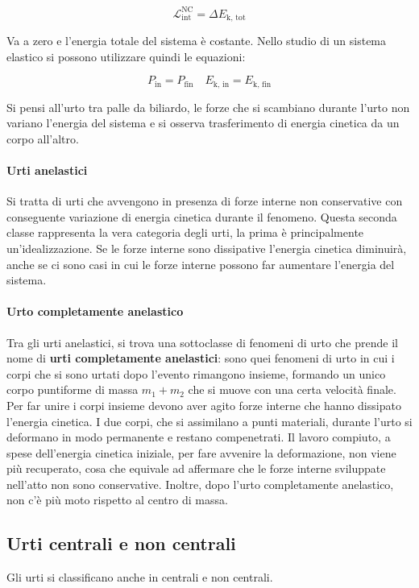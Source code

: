 \[
	\mathcal{L}_\text{int}^\text{NC}=\Delta E_\text{k, tot}
\]

Va a zero e l'energia totale del sistema è costante.
Nello studio di un sistema elastico si possono utilizzare quindi le equazioni:

\[
	P_\text{in}=P_\text{fin} \quad E_\text{k, in}=E_\text{k, fin}
\]

Si pensi all'urto tra palle da biliardo, le forze che si scambiano durante l'urto non variano l'energia del sistema e si osserva trasferimento di energia cinetica da un corpo all'altro.

\paragraph{Urti anelastici} Si tratta di urti che avvengono in presenza di forze interne non conservative con conseguente variazione di energia cinetica durante il fenomeno. Questa seconda classe rappresenta la vera categoria degli urti, la prima è principalmente un'idealizzazione. Se le forze interne sono dissipative l'energia cinetica diminuirà, anche se ci sono casi in cui le forze interne possono far aumentare l'energia del sistema.

\paragraph{Urto completamente anelastico} Tra gli urti anelastici, si trova una sottoclasse di fenomeni di urto che prende il nome di \textbf{urti completamente anelastici}: sono quei fenomeni di urto in cui i corpi che si sono urtati dopo l'evento rimangono insieme, formando un unico corpo puntiforme di massa $m_1+m_2$ che si muove con una certa velocità finale. Per far unire i corpi insieme devono aver agito forze interne che hanno dissipato l'energia cinetica. I due corpi, che si assimilano a punti materiali, durante l'urto si deformano in modo permanente e restano compenetrati. Il lavoro compiuto, a spese dell'energia cinetica iniziale, per fare avvenire la deformazione, non viene più recuperato, cosa che equivale ad affermare che le forze interne sviluppate nell'atto non sono conservative. Inoltre, dopo l'urto completamente anelastico, non c'è più moto rispetto al centro di massa.

\subsection{Urti centrali e non centrali}

Gli urti si classificano anche in centrali e non centrali.

